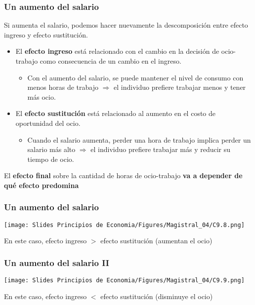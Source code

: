 \documentclass{beamer}
\begin{document}
\begin{frame}
    \frametitle{Un aumento del salario}
    Si aumenta el salario, podemos hacer nuevamente la descomposición entre efecto ingreso y efecto sustitución. \vspace{2mm} \pause
  \begin{itemize}  
        \item El \textbf{efecto ingreso} está relacionado con el cambio en la decisión de ocio- trabajo como consecuencia de un cambio en el ingreso. 
        \begin{itemize}
        \item Con el aumento del salario, se puede mantener el nivel de consumo con menos horas de trabajo $\Rightarrow$ el individuo prefiere trabajar menos y tener más ocio. \vspace{2mm} \pause
        \end{itemize}
        \item El \textbf{efecto sustitución} está relacionado al aumento en el costo de oportunidad del ocio. 
        \begin{itemize}
        \item Cuando el salario aumenta, perder una hora de trabajo implica perder un salario más alto $\Rightarrow$ el individuo prefiere trabajar más y reducir su tiempo de ocio. \pause
        \end{itemize}
        \end{itemize}
    \begin{boxB}
        \centering El \textbf{efecto final} sobre la cantidad de horas de ocio-trabajo \textbf{va a depender de qué efecto predomina}
    \end{boxB}
\end{frame}

\begin{frame}
  \frametitle{Un aumento del salario}
  \begin{center}
    \texttt{[image: Slides Principios de Economia/Figures/Magistral\_04/C9.8.png]}
  \end{center}
    En este caso, efecto ingreso $>$ efecto sustitución (aumentan el ocio)
\end{frame}

\begin{frame}
  \frametitle{Un aumento del salario II}
  \begin{center}
    \texttt{[image: Slides Principios de Economia/Figures/Magistral\_04/C9.9.png]}
  \end{center}
    En este caso, efecto ingreso $<$ efecto sustitución (disminuye el ocio)
\end{frame}
\end{document}

